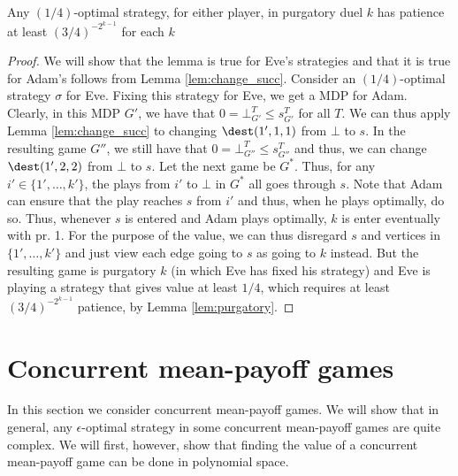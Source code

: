 \begin{lemma}
Any $(1/4)$-optimal strategy, for either player, in purgatory duel $k$ has patience at least $(3/4)^{-2^{k-1}}$ for each $k$
\end{lemma}
\begin{proof}
We will show that the lemma is true for Eve's strategies and that it is true for Adam's follows from Lemma \ref{lem:change_succ}.
Consider an $(1/4)$-optimal strategy $\sigma$ for Eve. Fixing this strategy for Eve, we get a MDP for Adam. Clearly, in this MDP $G'$, we have that $0=\bot^T_{G'}\leq s^T_{G'}$ for all $T$. We can thus apply Lemma \ref{lem:change_succ} to changing $\dest(1',1,1)$ from $\bot$ to $s$. In the resulting game $G''$, 
we still have that $0=\bot^T_{G''}\leq s^T_{G''}$ and thus, we can change $\dest(1',2,2)$ from $\bot$ to $s$.
Let the next game be $G^*$.
Thus, for any $i'\in \{1',\dots,k'\}$, the plays from $i'$ to $\bot$ in $G^*$ all goes through $s$. Note that Adam can ensure that the play reaches $s$ from $i'$ and thus, when he plays optimally, do so.
Thus, whenever $s$ is entered and Adam plays optimally, $k$ is enter eventually with pr. 1.
For the purpose of the value, we can thus disregard $s$ and vertices in $\{1',\dots,k'\}$ and just view each edge going to $s$ as going to $k$ instead.
But the resulting game is purgatory $k$ (in which Eve has fixed his strategy) and Eve is playing a strategy that gives value at least $1/4$, which requires  at least $(3/4)^{-2^{k-1}}$ patience, by Lemma \ref{lem:purgatory}.
\end{proof}





\section{Concurrent mean-payoff games}
In this section we consider concurrent mean-payoff games. 
We will show that in general, any  $\epsilon$-optimal strategy in some concurrent mean-payoff games are quite complex. 
We will first, however, show that finding the value of a concurrent mean-payoff game can be done in polynomial space.

